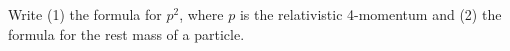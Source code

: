

\vspace*{\fill}
\centering

Write (1) the formula for $p^2$, where $p$ is the relativistic 4-momentum and (2) the formula for the rest mass of a particle.

\centering
\vspace*{\fill}

